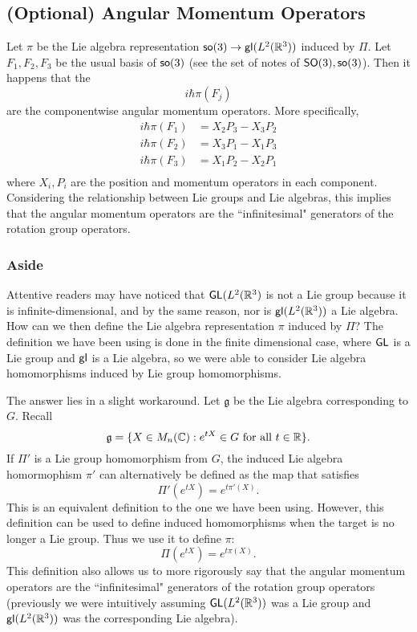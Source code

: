 \subsection{(Optional) Angular Momentum Operators}
Let $\pi$ be the Lie algebra representation $\operatorname{\textsf{so}}(3) \rightarrow \operatorname{\textsf{gl}}(L^2({\mathbb R}^3))$ induced by $\Pi$. Let $F_1, F_2, F_3$ be the usual basis of $\operatorname{\textsf{so}}(3)$ (see the set of notes of $\operatorname{\textsf{SO}}(3), \operatorname{\textsf{so}}(3)$). Then it happens that the
\[
    i\hbar\pi(F_j)
\]
are the componentwise angular momentum operators. More specifically,
\[
    \begin{split}
        i\hbar\pi(F_1) &= X_2P_3 - X_3P_2\\
        i\hbar\pi(F_2) &= X_3P_1 - X_1P_3\\
        i\hbar\pi(F_3) &= X_1P_2 - X_2P_1\\
    \end{split}
\]
where $X_i, P_i$ are the position and momentum operators in each component. Considering the relationship between Lie groups and Lie algebras, this implies that the angular momentum operators are the ``infinitesimal" generators of the rotation group operators.

\subsubsection{Aside}
Attentive readers may have noticed that $\operatorname{\textsf{GL}}(L^2({\mathbb R}^3)$ is not a Lie group because it is infinite-dimensional, and by the same reason, nor is $\operatorname{\textsf{gl}}(L^2({\mathbb R}^3))$ a Lie algebra. How can we then define the Lie algebra representation $\pi$ induced by $\Pi$? The definition we have been using is done in the finite dimensional case, where $\operatorname{\textsf{GL}}$ is a Lie group and $\operatorname{\textsf{gl}}$ is a Lie algebra, so we were able to consider Lie algebra homomorphisms induced by Lie group homomorphisms.

The answer lies in a slight workaround. Let $\mathfrak g$ be the Lie algebra corresponding to $G$. Recall
\[
    \mathfrak g = \{X \in M_n({\mathbb C}) : e^{tX} \in G \text{ for all } t \in {\mathbb R}\}.
\]
If $\Pi'$ is a Lie group homomorphism from $G$, the induced Lie algebra homormophism $\pi'$ can alternatively be defined as the map that satisfies
\[
    \Pi'(e^{tX}) = e^{t\pi'(X)}.
\]
This is an equivalent definition to the one we have been using. However, this definition can be used to define induced homomorphisms when the target is no longer a Lie group. Thus we use it to define $\pi$:
\[
    \Pi(e^{tX}) = e^{t\pi(X)}.
\]
This definition also allows us to more rigorously say that the angular momentum operators are the ``infinitesimal" generators of the rotation group operators (previously we were intuitively assuming $\operatorname{\textsf{GL}}(L^2({\mathbb R}^3))$ was a Lie group and $\operatorname{\textsf{gl}}(L^2({\mathbb R}^3))$ was the corresponding Lie algebra).
